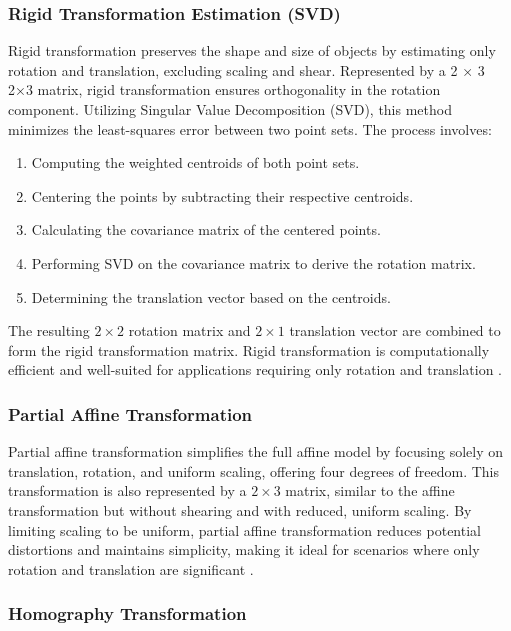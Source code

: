 \subsubsection{Rigid Transformation Estimation (SVD)}

Rigid transformation preserves the shape and size of objects by estimating only rotation and translation, excluding scaling and shear. Represented by a 
2
×
3
2×3 matrix, rigid transformation ensures orthogonality in the rotation component. Utilizing Singular Value Decomposition (SVD), this method minimizes the least-squares error between two point sets. The process involves:

\begin{enumerate} 
    \item Computing the weighted centroids of both point sets. 
    \item Centering the points by subtracting their respective centroids. 
    \item Calculating the covariance matrix of the centered points. 
    \item Performing SVD on the covariance matrix to derive the rotation matrix. 
    \item Determining the translation vector based on the centroids. 
\end{enumerate}

The resulting \(2 \times 2\) rotation matrix and \(2 \times 1\) translation vector are combined to form the rigid transformation matrix. Rigid transformation is computationally efficient and well-suited for applications requiring only rotation and translation \cite{sorkine2017least_squares}.

\subsubsection{Partial Affine Transformation}

Partial affine transformation simplifies the full affine model by focusing solely on translation, rotation, and uniform scaling, offering four degrees of freedom. This transformation is also represented by a \(2 \times 3\) matrix, similar to the affine transformation but without shearing and with reduced, uniform scaling. By limiting scaling to be uniform, partial affine transformation reduces potential distortions and maintains simplicity, making it ideal for scenarios where only rotation and translation are significant \cite{opencv_warp_affine}.

\subsubsection{Homography Transformation}

